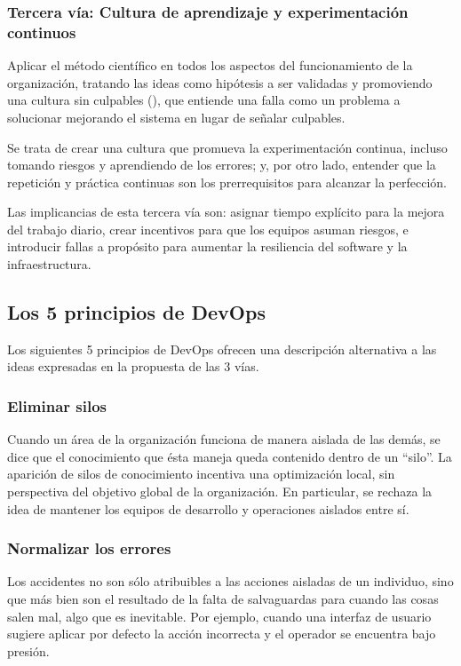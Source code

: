 \subsubsection{Tercera vía: Cultura de aprendizaje y experimentación continuos}

Aplicar el método científico en todos los aspectos del funcionamiento
de la organización, tratando las ideas como hipótesis a ser validadas
y promoviendo una cultura sin culpables (), que
entiende una falla como un problema a solucionar mejorando el sistema
en lugar de señalar culpables.

Se trata de crear una cultura que promueva la experimentación
continua, incluso tomando riesgos y aprendiendo de los errores; y, por
otro lado, entender que la repetición y práctica continuas son los
prerrequisitos para alcanzar la perfección.

Las implicancias de esta tercera vía son: asignar tiempo explícito
para la mejora del trabajo diario, crear incentivos para que los
equipos asuman riesgos, e introducir fallas a propósito para aumentar
la resiliencia del software y la infraestructura.

\subsection{Los 5 principios de DevOps}

Los siguientes 5 principios de DevOps
\cite{workbook} ofrecen una
descripción alternativa a las ideas expresadas en la propuesta de las
3 vías.

\subsubsection{Eliminar silos}

Cuando un área de la organización funciona de manera aislada de las
demás, se dice que el conocimiento que ésta maneja queda contenido
dentro de un ``silo''. La aparición de silos de conocimiento incentiva
una optimización local, sin perspectiva del objetivo global de la
organización. En particular, se rechaza la idea de mantener los
equipos de desarrollo y operaciones aislados entre sí.

\subsubsection{Normalizar los errores}

Los accidentes no son sólo atribuibles a las acciones aisladas de un
individuo, sino que más bien son el resultado de la falta de
salvaguardas para cuando las cosas salen mal, algo que es
inevitable. Por ejemplo, cuando una interfaz de usuario sugiere
aplicar por defecto la acción incorrecta y el operador se encuentra
bajo presión.

